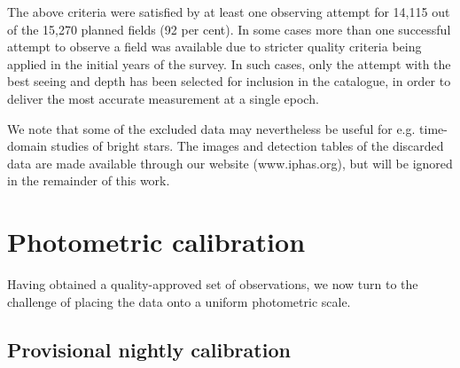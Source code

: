 \documentclass[a4paper,useAMS,usenatbib]{mn2e}
\begin{document}
The above criteria were satisfied by at least one observing attempt
for 14,115 out of the 15,270 planned fields (92 per cent).
In some cases more than one successful attempt to observe
a field was available due to stricter
quality criteria being applied in the initial years of the survey.
In such cases, only the attempt 
with the best seeing and depth has been selected
for inclusion in the catalogue, in order  
to deliver the most accurate measurement at a single epoch.

We note that some of the excluded data may nevertheless be useful
for e.g. time-domain studies of bright stars.
The images and detection tables of the discarded data are made
available through our website (www.iphas.org),
but will be ignored in the remainder of this work.

\section{Photometric calibration}
\label{sec:calibration}

Having obtained a quality-approved set of observations,
we now turn to the challenge of placing the data
onto a uniform photometric scale.

\subsection{Provisional nightly calibration}
\end{document}
